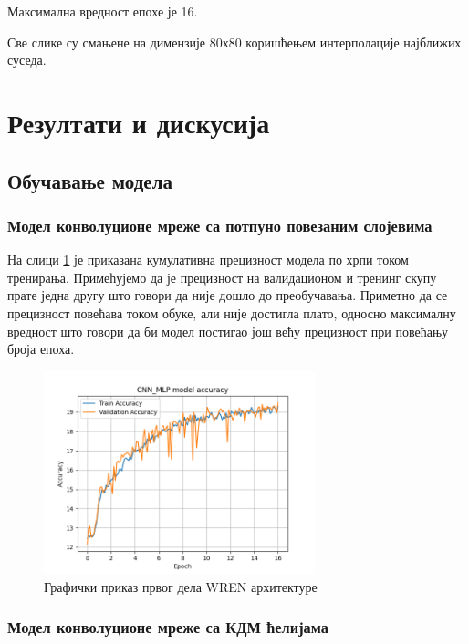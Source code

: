 \documentclass[a4paper, 12pt, master, utf8]{etf}
\begin{document}
Максимална вредност епохе је 16.
\newline

Све слике су смањене на димензије 80х80 коришћењем интерполације најближих суседа.
\newline

\section{Резултати и дискусија}
\label{sec:53}


\subsection{Обучавање модела}

\subsubsection{Модел конволуционе мреже са потпуно повезаним слојевима}

На слици \ref{fig:mlpacc} је приказана кумулативна прецизност модела по хрпи током тренирања. Примећујемо да 
је прецизност на валидационом и тренинг скупу прате једна другу што говори да није дошло до преобучавања. 
Приметно да се прецизност повећава током обуке, али није достигла плато, односно максималну вредност што говори да би модел постигао још већу прецизност
при повећању броја епоха.
\newline

\begin{figure}[H]
    \centering
    \includegraphics[width=0.7\textwidth]{../Results/CNN_MLP_19_09_09/accuracy.png}
    \caption{Графички приказ првог дела WREN архитектуре}
    \label{fig:mlpacc}
\end{figure}


\subsubsection{Модел конволуционе мреже са КДМ ћелијама}
\end{document}
